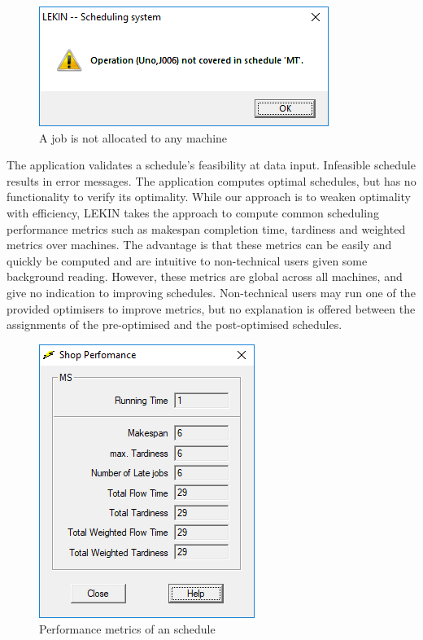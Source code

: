 \begin{figure}[H]
	\begin{center}
		\includegraphics[scale=0.8]{figures/lekin_unallocated.png}
	\end{center}
	\caption{A job is not allocated to any machine}
\end{figure}

The application validates a schedule's feasibility at data input. Infeasible schedule results in error messages. The application computes optimal schedules, but has no functionality to verify its optimality. While our approach is to weaken optimality with efficiency, LEKIN takes the approach to compute common scheduling performance metrics such as makespan completion time, tardiness and weighted metrics over machines. The advantage is that these metrics can be easily and quickly be computed and are intuitive to non-technical users given some background reading. However, these metrics are global across all machines, and give no indication to improving schedules. Non-technical users may run one of the provided optimisers to improve metrics, but no explanation is offered between the assignments of the pre-optimised and the post-optimised schedules.

\begin{figure}[H]
	\begin{center}
		\includegraphics[scale=0.8]{figures/lekin_metric.png}
	\end{center}
	\caption{Performance metrics of an schedule}
\end{figure}

